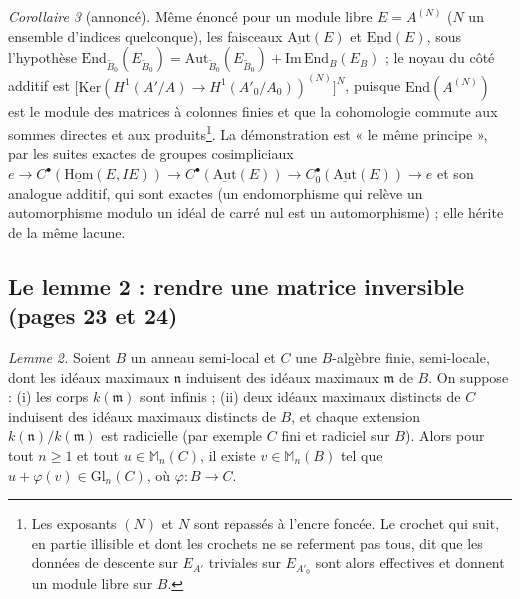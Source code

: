 \documentclass[11pt,a4paper]{article}
\begin{document}
\emph{Corollaire 3} (annoncé). Même énoncé pour un module libre $E =
A^{(N)}$ ($N$ un ensemble d'indices quelconque), les faisceaux
$\underline{\mathrm{Aut}}(E)$ et $\underline{\mathrm{End}}(E)$, sous
l'hypothèse $\mathrm{End}_{\widetilde{B}_0}(E_{\widetilde{B}_0}) =
\mathrm{Aut}_{\widetilde{B}_0}(E_{\widetilde{B}_0}) +
\mathrm{Im}\,\mathrm{End}_{B}(E_{B})$ ; le noyau du côté additif est
$\bigl[\mathrm{Ker}(H^1(A'/A) \to H^1(A'_0/A_0))^{(N)}\bigr]^N$, puisque
$\mathrm{End}(A^{(N)})$ est le module des matrices à colonnes finies et que
la cohomologie commute aux sommes directes et aux produits\footnote{Les
exposants $(N)$ et $N$ sont repassés à l'encre foncée. Le crochet qui suit,
en partie illisible et dont les crochets ne se referment pas tous, dit que
les données de descente sur $E_{A'}$ triviales sur $E_{A'_0}$ sont alors
effectives et donnent un module libre sur $B$.}. La démonstration est « le
même principe », par les suites exactes de groupes cosimpliciaux $e \to
C^{\bullet}(\underline{\mathrm{Hom}}(E, IE)) \to
C^{\bullet}(\underline{\mathrm{Aut}}(E)) \to
C^{\bullet}_0(\underline{\mathrm{Aut}}(E)) \to e$ et son analogue additif,
qui sont exactes (un endomorphisme qui relève un automorphisme modulo un
idéal de carré nul est un automorphisme) ; elle hérite de la même lacune.

\subsection*{Le lemme 2 : rendre une matrice inversible (pages 23 et 24)}

\emph{Lemme 2.} Soient $B$ un anneau semi-local et $C$ une $B$-algèbre finie,
semi-locale, dont les idéaux maximaux $\mathfrak{n}$ induisent des idéaux
maximaux $\mathfrak{m}$ de $B$. On suppose : (i) les corps
$k(\mathfrak{m})$ sont infinis ; (ii) deux idéaux maximaux distincts de $C$
induisent des idéaux maximaux distincts de $B$, et chaque extension
$k(\mathfrak{n})/k(\mathfrak{m})$ est radicielle (par exemple $C$ fini et
radiciel sur $B$). Alors pour tout $n \geqslant 1$ et tout $u \in
\mathbb{M}_n(C)$, il existe $v \in \mathbb{M}_n(B)$ tel que $u + \varphi(v)
\in \mathrm{Gl}_n(C)$, où $\varphi : B \to C$.
\end{document}
